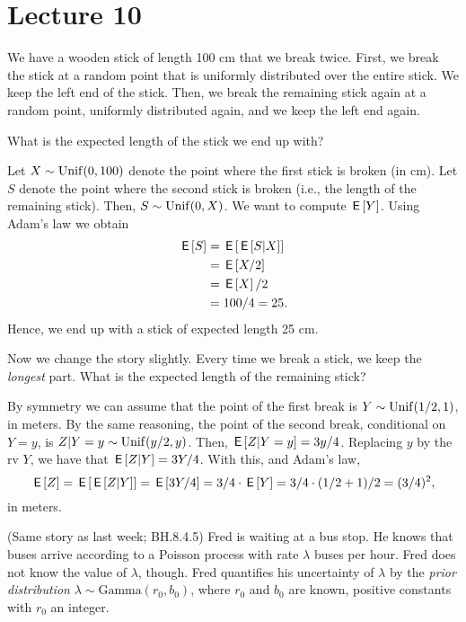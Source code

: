 \documentclass[lectures-demo]{subfiles}
\begin{document}
\section{Lecture 10}

We have a wooden stick of length 100 cm that we break twice.
First, we break the stick at a random point that is uniformly distributed over the entire stick.
We keep the left end of the stick.
Then, we break the remaining stick again at a random point, uniformly distributed again, and we keep the left end again.

\begin{exercise}
What is the expected length of the stick we end up with?
\begin{solution}
Let $X \sim \mathrm{Unif}(0,100)$ denote the point where the first stick is broken (in cm). Let $S$ denote the point where the second stick is broken (i.e., the length of the remaining stick). Then, $S \sim \mathrm{Unif}(0,X)$. We want to compute $\,\mathsf{E}\left[Y\right]$. Using Adam's law we obtain
\begin{align}
    \,\mathsf{E}\left[S\right] &= \,\mathsf{E}\left[\,\mathsf{E}\left[S|X\right]\right] \\
    &= \,\mathsf{E}\left[X/2\right] \\
    &= \,\mathsf{E}\left[X\right]/2 \\
    &= 100/4 = 25.
\end{align}
Hence, we end up with a stick of expected length 25 cm.
\end{solution}
\end{exercise}

\begin{exercise}
Now we change the story slightly. Every time we break a stick, we keep the \textit{longest} part. What is the expected length of the remaining stick?
\begin{solution}
By symmetry we can assume that the point of the first break is $Y\sim\mathrm{Unif}(1/2, 1)$, in meters. By the same reasoning, the point of the second break, conditional on $Y=y$, is $Z|Y=y \sim \mathrm{Unif}(y/2, y)$. Then, $\,\mathsf{E}\left[Z|Y=y\right] = 3y/4$. Replacing $y$ by the rv $Y$, we have that $\,\mathsf{E}\left[Z|Y\right] = 3 Y/4$. With this, and Adam's law,
\begin{equation}
\,\mathsf{E}\left[Z\right] = \,\mathsf{E}\left[\,\mathsf{E}\left[Z|Y\right]\right] = \,\mathsf{E}\left[3Y/4\right] = 3/4\cdot \,\mathsf{E}\left[Y\right]= 3/4\cdot (1/2+1)/2 = (3/4)^{2},
\end{equation}
in meters.

\end{solution}
\end{exercise}



(Same story as last week; BH.8.4.5) Fred is waiting at a bus stop. He knows that buses arrive according to a Poisson process with rate $\lambda$ buses per hour. Fred does not know the value of $\lambda$, though. Fred quantifies his uncertainty of $\lambda$ by the \textit{prior distribution} $\lambda \sim \text{Gamma}(r_0, b_0)$, where $r_0$ and $b_0$ are known, positive constants with $r_0$ an integer.
\end{document}
